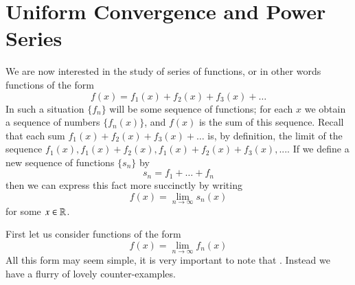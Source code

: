 



\section{Uniform Convergence and Power Series}


\begin{rmk}
    We are now interested in the study of series of functions, or in other words functions of the form \begin{equation*}
        f(x) = f_1(x) + f_2(x) + f_3(x) + \hdots
    \end{equation*}
    In such a situation $\{f_n\}$ will be some sequence of functions; for each $x$ we obtain a sequence of numbers $\{f_n(x)\}$, and $f(x)$ is the sum of this sequence. Recall that each sum $f_1(x)+f_2(x)+f_3(x) + \hdots$ is, by definition, the limit of the sequence $f_1(x),f_1(x)+f_2(x),f_1(x)+f_2(x)+f_3(x),...$. If we define a new sequence of functions $\{s_n\}$ by \begin{equation*}
        s_n = f_1 + \hdots + f_n
    \end{equation*}
    then we can express this fact more succinctly by writing \begin{equation*}
        f(x) = \lim\limits_{n\rightarrow \infty}s_n(x)
    \end{equation*}
    for some $x \in \mathbb R$.
\end{rmk}


\begin{rmk}
    First let us consider functions of the form \begin{equation*}
        f(x) = \lim\limits_{n\rightarrow\infty}f_n(x)
    \end{equation*}
    All this form may seem simple, it is very important to note that . Instead we have a flurry of lovely counter-examples.
\end{rmk}

